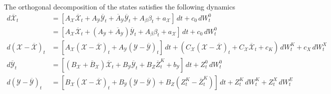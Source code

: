 \documentclass[11pt,twoside]{amsart}
\theoremstyle{definition}
\numberwithin{equation}{section}
\begin{document}
The orthogonal decomposition of the states satisfies the following dynamics
\begin{align*}
    d\overline{\mathcal{X}}_t 
    &= [A_{\mathcal{X}} \overline{{\mathcal{X}}}_t + A_{\mathcal{Y}} \overline{\mathcal{Y}}_t + \overline{A}_{\mathcal{Y}} \overline{{\mathcal{Y}}}_t + A_\beta \beta_t + a_\mathcal{X}]\,dt + c_0\,dW_t^{0} \\
    &= [A_{\mathcal{X}} \overline{{\mathcal{X}}}_t + (A_{\mathcal{Y}} + \overline{A}_{\mathcal{Y}}) \overline{{\mathcal{Y}}}_t + A_\beta \beta_t + a_\mathcal{X}]\,dt + c_0\,dW_t^{0} \\
    d({\mathcal{X}} - \overline{{\mathcal{X}}})_t 
    &= [A_{\mathcal{X}}({\mathcal{X}} - \overline{{\mathcal{X}}})_t + A_{\mathcal{Y}}({\mathcal{Y}} - \overline{{\mathcal{Y}}})_t]\,dt + (C_{\mathcal{X}}({\mathcal{X}} - \overline{{\mathcal{X}}})_t + C_{\mathcal{X}} \overline{{\mathcal{X}}}_t +c_K )\,dW_t^{K} + c_X\,dW_t^{X} \\
    d\overline{\mathcal{Y}}_t 
    &= [(B_{\mathcal{X}} + \overline{B}_{\mathcal{X}}) \overline{\mathcal{X}}_t + B_{\mathcal{Y}} \overline{\mathcal{Y}}_t + B_Z \overline{Z}^K_t + b_\mathcal{Y}]\,dt + {Z}_t^{0}\,dW_t^{0} \\
    d({\mathcal{Y}} - \overline{{\mathcal{Y}}})_t 
    &= [B_{\mathcal{X}}({\mathcal{X}} - \overline{{\mathcal{X}}})_t + B_{\mathcal{Y}}({\mathcal{Y}} - \overline{{\mathcal{Y}}}) + B_Z({Z}^K_t - \overline{Z}^K_t)]\,dt + {Z}_t^{K}\,dW_t^{K} + {Z}_t^{X}\,dW^E_t
\end{align*}
\end{document}
